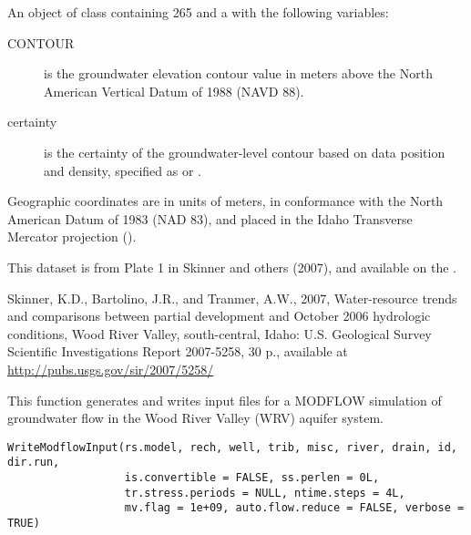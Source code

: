 \documentclass[a4paper]{book}
\begin{document}
\begin{Format}
An object of  class containing 265  and a  with the following variables:
\begin{description}

\item[CONTOUR] is the groundwater elevation contour value in meters above the North American Vertical Datum of 1988 (NAVD 88).
\item[certainty] is the certainty of the groundwater-level contour based on data position and density, specified as  or .

\end{description}

Geographic coordinates are in units of meters, in conformance with the North American Datum of 1983 (NAD 83), and placed in the
Idaho Transverse Mercator projection ().
\end{Format}
%
\begin{Source}\relax
This dataset is from Plate 1 in Skinner and others (2007), and available on the .
\end{Source}
%
\begin{References}\relax
Skinner, K.D., Bartolino, J.R., and Tranmer, A.W., 2007, Water-resource trends and comparisons between partial development and October 2006 hydrologic conditions, Wood River Valley, south-central, Idaho: U.S. Geological Survey Scientific Investigations Report 2007-5258, 30 p., available at \url{http://pubs.usgs.gov/sir/2007/5258/}
\end{References}
%
\begin{Examples}
\end{Examples}
%
\begin{Description}\relax
This function generates and writes input files for a MODFLOW simulation of groundwater flow in the Wood River Valley (WRV) aquifer system.
\end{Description}
%
\begin{Usage}
\begin{verbatim}
WriteModflowInput(rs.model, rech, well, trib, misc, river, drain, id, dir.run,
                  is.convertible = FALSE, ss.perlen = 0L,
                  tr.stress.periods = NULL, ntime.steps = 4L,
                  mv.flag = 1e+09, auto.flow.reduce = FALSE, verbose = TRUE)
\end{verbatim}
\end{Usage}
\end{document}
